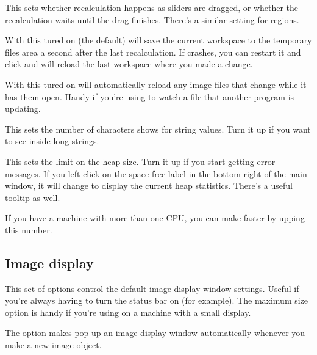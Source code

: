 \begin{description}
This sets whether recalculation happens as sliders are dragged, or whether the
recalculation waits until the drag finishes. There's a similar setting for
regions.

\item[\ct{Auto workspace save}]

With this tured on (the default) \nip{} will save the current workspace to
the temporary files area a second after the last recalculation. If \nip{}
crashes, you can restart it and click 
and \nip{} will reload the last workspace where you made a change.

\item[\ct{Auto-reload on file change}]

With this tured on \nip{} will automatically reload any image files that
change while it has them open. Handy if you're using \nip{} to watch a file
that another program is updating.

\item[\ct{Maximum text display}]

This sets the number of characters \nip{} shows for string values. Turn it up
if you want to see inside long strings.

\item[\ct{Maximum heap}]

This sets the limit on the heap size. Turn it up if you start getting  error messages. If you left-click on the space free label in the bottom
right of the main window, it will change to display the current heap
statistics. There's a useful tooltip as well.

\item[\ct{Number of CPUs to use}]

If you have a machine with more than one CPU, you can make \nip{} faster by
upping this number.

\end{description}

\subsection{Image display}

This set of options control the default image display window settings. Useful
if you're always having to turn the status bar on (for example). The maximum
size option is handy if you're using \nip{} on a machine with a small display.

The  option makes \nip{} pop up an image display window 
automatically whenever you make a new image object.

